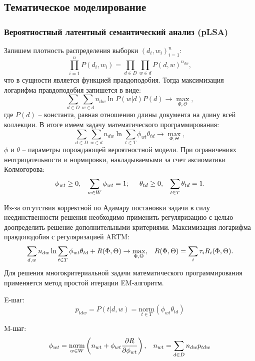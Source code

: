 \subsection{Тематическое моделирование}
\subsubsection{Вероятностный латентный семантический анализ (pLSA)}
\par
Запишем плотность распределения выборки $\left(d_i, w_i\right)_{i=1}^{n}$:
\[\prod_{i=1}^{n} P(d_i, w_i) = \prod_{d\in D} \prod_{w\in d} P(d,w)^{n_{dw}},\]
что в сущности является функцией правдоподобия. Тогда максимизация логарифма правдоподобия запишется в виде:
\[\sum\limits_{d\in D}\sum\limits_{w\in d} n_{dw} \ln P(w|d)P(d) \to \max_{\Phi, \Theta},\]
где $P(d)$ -- константа, равная отношению длины документа на длину всей коллекции. В итоге имеем задачу математического программирования:
\[\sum\limits_{d\in D}\sum\limits_{w\in d} n_{dw} \ln\sum\limits_{t\in T} \phi_{wt}\theta_{td}\to \max_{\Phi, \Theta},\]
$\phi$ и $\theta$ -- параметры порождающей вероятностной модели. При ограничениях неотрицательности и нормировки, накладываемыми за счет аксиоматики Колмогорова:
\[\phi_{wt} \geq 0, \hspace*{0.3cm} \sum\limits_{w\in W} \phi_{wt} = 1; \hspace*{0.5cm} \theta_{td} \geq 0, \hspace*{0.3cm} \sum\limits_{t\in T} \theta_{td} = 1.\]
\bigskip\par
Из-за отсутствия корректной по Адамару постановки задачи в силу неединственности решения необходимо применить регуляризацию с целью доопределить решение дополнительными критериями.
Максимизация логарифма правдоподобия с регуляризацией ARTM:
\[\sum\limits_{d,w} n_{dw} \ln \sum\limits_{t\in T} \phi_{wt}\theta_{td} + R(\Phi, \Theta) \to \max_{\Phi, \Theta}, \hspace*{0.3cm} R(\Phi, \Theta) = \sum\limits_{i} \tau_i R_i(\Phi, \Theta).\]
Для решения многокритериальной задачи математического программирования применяется метод простой итерации EM-алгоритм.
\bigskip\par
E-шаг:
\[p_{tdw} = P(t|d,w) = \underset{t\in T}{\mathrm{norm}}\left(\phi_{wt}\theta_{td}\right)\]
\bigskip\par
M-шаг:
\[\phi_{wt} = \underset{w\in W}{\mathrm{norm}} \left(n_{wt} + \phi_{wt}\dfrac{\partial R}{\partial \phi_{wt}}\right), \hspace*{0.3cm} n_{wt} = \sum\limits_{d\in D}n_{dw}p_{tdw}\]
